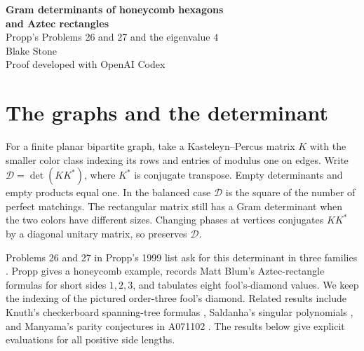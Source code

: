 \documentclass[11pt,letterpaper]{article}
\newcommand{\Gram}{\mathcal D}
\begin{document}
\begin{center}
{\Large\bfseries\color{ink} Gram determinants of honeycomb hexagons\\[2pt] and Aztec rectangles}\\[7pt]
{\large Propp's Problems 26 and 27 and the eigenvalue \(4\)}\\[8pt]
Blake Stone\\[-1pt]{\small Proof developed with OpenAI Codex}
\end{center}
\begin{abstract}
We evaluate the Kasteleyn--Percus Gram determinant for every honeycomb hexagon, Aztec rectangle and fool's rectangle. For a hexagon the answer uses a Gram matrix whose order is the color imbalance. For an Aztec rectangle it is a product of two Toeplitz minors with an explicit finite root formula. For a fool's rectangle we obtain the entire spectrum. The eight historical fool's-diamond entries are the positive square roots of the determinants, and the two parity products conjectured by Seiichi Manyama follow. We also determine the exact multiplicity of the eigenvalue \(4\) on every Aztec rectangle, explaining an observation of Nicolau Saldanha.
\end{abstract}

\section{The graphs and the determinant}
For a finite planar bipartite graph, take a Kasteleyn--Percus matrix \(K\) with the smaller color class indexing its rows and entries of modulus one on edges. Write
\(\Gram=\det(KK^*)\), where \(K^*\) is conjugate transpose. Empty determinants and empty products equal one. In the balanced case \(\Gram\) is the square of the number of perfect matchings. The rectangular matrix still has a Gram determinant when the two colors have different sizes. Changing phases at vertices conjugates \(KK^*\) by a diagonal unitary matrix, so preserves \(\Gram\).

Problems 26 and 27 in Propp's 1999 list ask for this determinant in three families \cite[pp.~282--283]{propp}. Propp gives a honeycomb example, records Matt Blum's Aztec-rectangle formulas for short sides \(1,2,3\), and tabulates eight fool's-diamond values. We keep the indexing of the pictured order-three fool's diamond. Related results include Knuth's checkerboard spanning-tree formulas \cite{knuth}, Saldanha's singular polynomials \cite{saldanha}, and Manyama's parity conjectures in A071102 \cite{oeis}. The results below give explicit evaluations for all positive side lengths.
\end{document}
